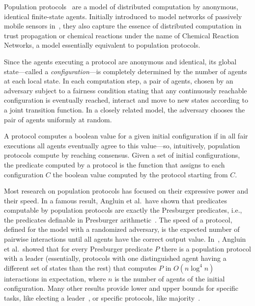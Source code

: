 Population protocols~\cite{AADFP04} are a model of distributed
computation by anonymous, identical finite-state agents.  Initially
introduced to model networks of passively mobile sensors
in~\cite{AADFP04}, they also capture the essence of distributed
computation in trust propagation or chemical reactions under the name
of Chemical Reaction Networks, a model essentially equivalent to
population protocols.

Since the agents executing a protocol are anonymous and identical, its
global state---called a \emph{configuration}---is completely
determined by the number of agents at each local state. In each
computation step, a pair of agents, chosen by an adversary subject to
a fairness condition stating that any continuously reachable
configuration is eventually reached, interact and move to new states
according to a joint transition function. In a closely related model,
the adversary chooses the pair of agents uniformly at random.

A protocol computes a boolean value for a given initial configuration
if in all fair executions all agents eventually agree to this
value---so, intuitively, population protocols compute by reaching
consensus. Given a set of initial configurations, the predicate
computed by a protocol is the function that assigns to each
configuration $C$ the boolean value computed by the protocol starting
from $C$.


Most research on population protocols has focused on their expressive
power and their speed.  In a famous result, Angluin et al.\ have shown
that predicates computable by population protocols are exactly the
Presburger predicates, i.e., the predicates definable in Presburger
arithmetic~\cite{AAER07}. The speed of a protocol, defined for the
model with a randomized adversary, is the expected number of pairwise
interactions until all agents have the correct output
value. In~\cite{AAE08a}, Angluin et al.\ showed that for every
Presburger predicate $P$ there is a population protocol with a leader
(essentially, protocols with one distinguished agent having a
different set of states than the rest) that computes $P$ in
$O(n \log^4 n)$ interactions in expectation, where $n$ is the number
of agents of the initial configuration. Many other results provide
lower and upper bounds for specific tasks, like electing a
leader~\cite{DS15}, or specific protocols, like majority~\cite{AGV15}.

